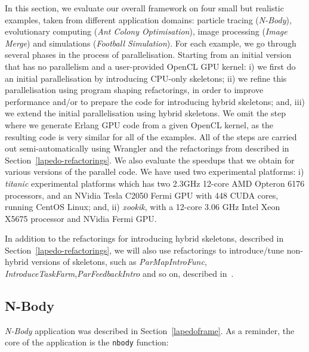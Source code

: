 \documentclass[final]{jfp1}
\begin{document}
\label{sec:usecases}
In this section, we evaluate our overall framework on four small
but realistic examples, taken from different application domains: particle
tracing (\emph{N-Body}), evolutionary
computing (\emph{Ant Colony Optimisation}), image processing (\emph{Image
  Merge}) and simulations (\emph{Football Simulation}). For each example,
we go through several phases in the process of parallelisation.
Starting from an initial version that has no parallelism and a
user-provided OpenCL GPU kernel:
i) we first do an initial
parallelisation by introducing CPU-only skeletons;
ii) we refine this parallelisation using program shaping refactorings, 
in order to improve performance and/or 
to prepare the code for introducing hybrid
skeletons; and, iii) we extend the initial parallelisation using
hybrid skeletons. We omit the step where we generate Erlang GPU
code from a given OpenCL kernel, as the resulting code is very
similar for all of the examples. All of the steps are carried out
semi-automatically using Wrangler and the refactorings from
described in Section~\ref{lapedo-refactorings}.
We also evaluate the speedups that we obtain for various versions of the parallel code.
We have used two experimental platforms: i) \emph{titanic} experimental platforms
which has two 2.3GHz 12-core AMD Opteron 6176
processors, and an NVidia Tesla C2050 Fermi GPU with 448 CUDA cores, running 
CentOS Linux; and, ii) \emph{xookik}, with a 12-core 3.06 GHz Intel Xeon X5675 processor and NVidia Fermi GPU.

In addition to the refactorings for introducing hybrid skeletons, described in Section~\ref{lapedo-refactorings}, we will also use refactorings to introduce/tune non-hybrid versions of skeletons, such as \emph{ParMapIntroFunc}, \emph{IntroduceTaskFarm},\emph{ParFeedbackIntro} and so on, described in~\cite{pdp2014}.
\vspace{-6pt}
\subsection{N-Body}
\label{sec:nbody}
\vspace{-6pt}
\emph{N-Body} application was described in Section~\ref{lapedoframe}. 
As a reminder, the core of the application is the \lstinline{nbody}
function:
\end{document}
